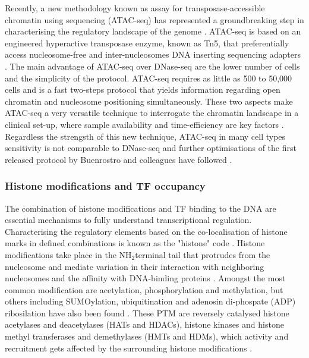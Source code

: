 Recently, a new methodology known as assay for transposase-accessible chromatin using sequencing (ATAC-seq) has represented a groundbreaking step in characterising the regulatory landscape of the genome \parencite{Buenrostro2013}. ATAC-seq is based on an engineered hyperactive transposase enzyme, known as Tn5, that preferentially access nucleosome-free and inter-nucleosomes DNA inserting sequencing adapters \parencite{Gradman2008, Adey2010}. The main advantage of ATAC-seq over DNase-seq are the lower number of cells and the simplicity of the protocol. ATAC-seq requires as little as 500 to 50,000 cells and is a fast two-steps protocol that yields information regarding open chromatin and nucleosome positioning simultaneously. These two aspects make ATAC-seq a very versatile technique to interrogate the chromatin landscape in a clinical set-up, where sample availability and time-efficiency are key factors \parencite{Scharer2016,Qu2015,Qu2017}. Regardless the strengsth of this new technique, ATAC-seq in many cell types sensitivity is not comparable to DNase-seq and further optimisations of the first released protocol by Buenrostro and colleagues have followed \parencite{Corces2016,Sos2016,Corces2017}. 

\subsubsection{Histone modifications and TF occupancy}

The combination of histone modifications and TF binding to the DNA are essential mechanisms to fully understand transcriptional regulation. Characterising the regulatory elements based on the co-localisation of histone marks in defined combinations is known as the "histone" code \parencite{Jenuwein2001}. Histone modifications take place in the NH$_2$terminal tail that protrudes from the nucleosome and mediate variation in their interaction with neighboring nucleosomes and the affinity with DNA-binding proteins \parencite{Bannister2011}. Amongst the most common modification are acetylation, phosphorylation and methylation, but others including SUMOylation, ubiquitination and adenosin di-phospate (ADP) ribosilation have also been found \parencite{Bayarsaihan2011}. These PTM are reversely catalysed histone acetylases and deacetylases (HATs and HDACs), histone kinases and histone methyl transferases and demethylases (HMTs and HDMs), which activity and recruitment gets affected by the surrounding histone modifications \parencite{Bannister2011,Shi2006,Nelson2006}. 

